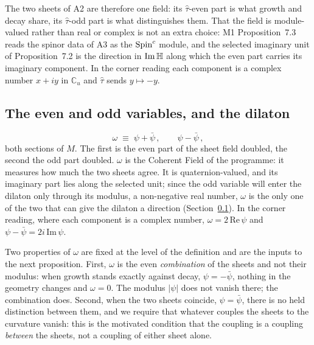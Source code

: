 The two sheets of A2 are therefore one field: its $\hat\tau$-even part is
what growth and decay share, its $\hat\tau$-odd part is what distinguishes
them. That the field is module-valued rather than real or complex is not an
extra choice: M1 Proposition~7.3 reads the spinor data of A3 as the
$\text{Spin}^c$ module, and the selected imaginary unit of Proposition~7.2 is the
direction in $\mathrm{Im}\,\mathbb{H}$ along which the even part carries its
imaginary component. In the corner reading each component is a complex
number $x+iy$ in $\mathbb{C}_{u}$ and $\hat\tau$ sends $y\mapsto-y$.
\rigD

\subsection{The even and odd variables, and the dilaton}\label{sec:omega}

\begin{definition}\label{def:omega}
\begin{equation}\label{eq:omega-def}
  \omega\;\equiv\;\psi+\bar\psi\,,
  \qquad
  \psi-\bar\psi\,,
\end{equation}
both sections of $M$. The first is the even part of the sheet field doubled,
the second the odd part doubled. $\omega$ is the Coherent Field of the
programme: it measures how much the two sheets agree. It is quaternion-valued,
and its imaginary part lies along the selected unit; since the odd variable
will enter the dilaton only through its modulus, a non-negative real number,
$\omega$ is the only one of the two that can give the dilaton a direction
(Section~\ref{sec:omega}). In the corner reading, where each component is a
complex number, $\omega=2\,\mathrm{Re}\,\psi$ and $\psi-\bar\psi=2i\,\mathrm{Im}\,\psi$.
\end{definition}

Two properties of $\omega$ are fixed at the level of the definition and are
the inputs to the next proposition. First, $\omega$ is the even
\emph{combination} of the sheets and not their modulus: when growth stands
exactly against decay, $\psi=-\bar\psi$, nothing in the geometry changes and
$\omega=0$. The modulus $|\psi|$ does not vanish there; the combination
does. Second, when the two sheets coincide, $\psi=\bar\psi$, there is no held
distinction between them, and we require that whatever couples the sheets to
the curvature vanish: this is the motivated condition that the coupling is a
coupling \emph{between} the sheets, not a coupling of either sheet alone.
\rigM

